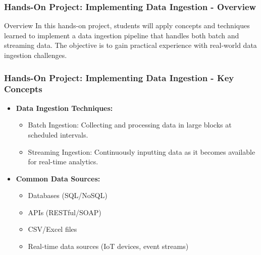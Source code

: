 \documentclass[aspectratio=169]{beamer}
\begin{document}
\begin{frame}[fragile]
    \frametitle{Hands-On Project: Implementing Data Ingestion - Overview}
    \begin{block}{Overview}
        In this hands-on project, students will apply concepts and techniques learned to implement a data ingestion pipeline that handles both batch and streaming data. The objective is to gain practical experience with real-world data ingestion challenges.
    \end{block}
\end{frame}

\begin{frame}[fragile]
    \frametitle{Hands-On Project: Implementing Data Ingestion - Key Concepts}
    \begin{itemize}
        \item \textbf{Data Ingestion Techniques:}
            \begin{itemize}
                \item Batch Ingestion: Collecting and processing data in large blocks at scheduled intervals.
                \item Streaming Ingestion: Continuously inputting data as it becomes available for real-time analytics.
            \end{itemize}
        \item \textbf{Common Data Sources:}
            \begin{itemize}
                \item Databases (SQL/NoSQL)
                \item APIs (RESTful/SOAP)
                \item CSV/Excel files
                \item Real-time data sources (IoT devices, event streams)
            \end{itemize}
    \end{itemize}
\end{frame}
\end{document}
